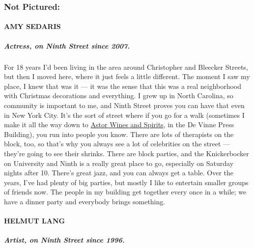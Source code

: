 \hypertarget{not-pictured}{%
\subsubsection{Not Pictured:}\label{not-pictured}}

\hypertarget{amy-sedaris}{%
\paragraph{AMY SEDARIS}\label{amy-sedaris}}

\hypertarget{actress-on-ninth-street-since-2007}{%
\subparagraph{\texorpdfstring{\textbf{Actress, on Ninth Street since
2007.}}{Actress, on Ninth Street since 2007.}}\label{actress-on-ninth-street-since-2007}}

For 18 years I'd been living in the area around Christopher and Bleecker
Streets, but then I moved here, where it just feels a little different.
The moment I saw my place, I knew that was it --- it was the sense that
this was a real neighborhood with Christmas decorations and everything.
I grew up in North Carolina, so community is important to me, and Ninth
Street proves you can have that even in New York City. It's the sort of
street where if you go for a walk (sometimes I make it all the way down
to \href{https://www.astorwines.com/}{Astor Wines and Spirits}, in the
De Vinne Press Building), you run into people you know. There are lots
of therapists on the block, too, so that's why you always see a lot of
celebrities on the street --- they're going to see their shrinks. There
are block parties, and the Knickerbocker on University and Ninth is a
really great place to go, especially on Saturday nights after 10.
There's great jazz, and you can always get a table. Over the years, I've
had plenty of big parties, but mostly I like to entertain smaller groups
of friends now. The people in my building get together every once in a
while; we have a dinner party and everybody brings something.

\hypertarget{helmut-lang}{%
\paragraph{HELMUT LANG}\label{helmut-lang}}

\hypertarget{artist-on-ninth-street-since-1996}{%
\subparagraph{\texorpdfstring{\textbf{Artist, on Ninth Street since
1996.}}{Artist, on Ninth Street since 1996.}}\label{artist-on-ninth-street-since-1996}}

